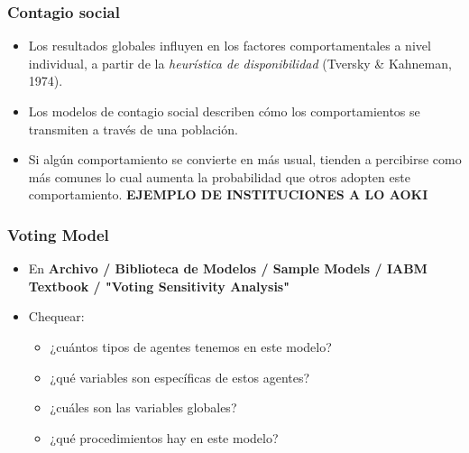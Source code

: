 \documentclass[11pt]{beamer}
\begin{document}
\begin{frame}
	\frametitle{Contagio social}
\begin{itemize}
	\item Los resultados globales influyen en los factores comportamentales a nivel individual, a partir de la \textit{heurística de disponibilidad} (Tversky \& Kahneman, 1974).
    \item Los modelos de contagio social describen cómo los comportamientos se transmiten a través de una población.
    \item Si algún comportamiento se convierte en más usual, tienden a percibirse como más comunes lo cual aumenta la probabilidad que otros adopten este comportamiento. \textbf{EJEMPLO DE INSTITUCIONES A LO AOKI}
\end{itemize}
\end{frame}

\begin{frame}
	\frametitle{Voting Model}
\begin{itemize}
	\item En \textbf{Archivo / Biblioteca de Modelos / Sample Models / IABM Textbook / "Voting Sensitivity Analysis"}
	\item Chequear:
	\begin{itemize}
		\item ¿cuántos tipos de agentes tenemos en este modelo?
		\item ¿qué variables son específicas de estos agentes? 
		\item ¿cuáles son las variables globales?
		\item ¿qué procedimientos hay en este modelo?
	\end{itemize}
\end{itemize}		
\end{frame}
\end{document}
